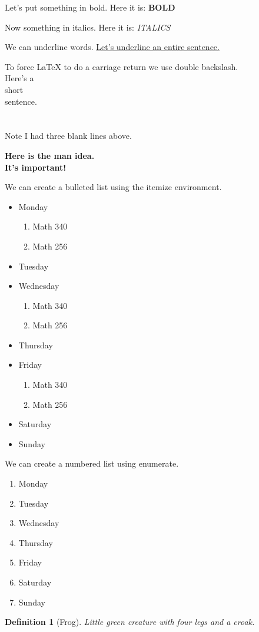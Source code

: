 \documentclass{article}
\newtheorem{definition}{Definition}
\begin{document}
Let's put something in bold. Here it is: \textbf{BOLD}

Now something in italics. Here it is: \textit{ITALICS}

We can underline words. \underline{Let's underline an entire sentence.}

To force \LaTeX{} to do a carriage return we use double backslash.\\
Here's a \\ short \\sentence. \\ \\ \\ Note I had three blank lines above.

\begin{center}
\textbf{Here is the man idea.\\ It's important!}
\end{center}

We can create a bulleted list using the itemize environment.
\begin{itemize}
\item Monday
    \begin{enumerate}
    \item Math 340
    \item Math 256
    \end{enumerate}
\item Tuesday
\item Wednesday
    \begin{enumerate}
    \item Math 340
    \item Math 256
    \end{enumerate}
\item Thursday
\item Friday
    \begin{enumerate}
    \item Math 340
    \item Math 256
    \end{enumerate}
\item Saturday
\item Sunday
\end{itemize}

We can create a numbered list using enumerate.
\begin{enumerate}
\item Monday
\item Tuesday
\item Wednesday
\item Thursday
\item Friday
\item Saturday
\item Sunday
\end{enumerate}

\begin{definition}[Frog]
Little green creature with four legs and a croak.
\end{definition}
\end{document}
